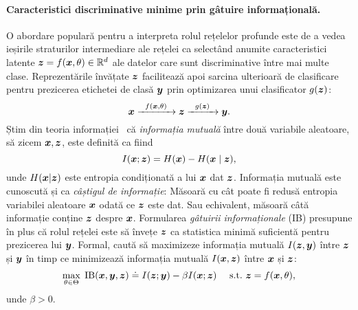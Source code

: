 \documentclass[../../book-main_ro.tex]{subfiles}
\begin{document}
\paragraph{Caracteristici discriminative minime prin gâtuire informațională.}
O abordare populară pentru a interpreta rolul rețelelor profunde este de a vedea ieșirile straturilor intermediare ale rețelei ca selectând anumite caracteristici latente $\bm{z} = f(\bm{x}, \theta) \in \mathbb{R}^d$ ale datelor care sunt discriminative între mai multe clase. Reprezentările învățate $\bm{z}$ facilitează apoi sarcina ulterioară de clasificare pentru prezicerea etichetei de clasă $\bm{y}$ prin optimizarea unui clasificator $g(\bm{z})$:
\begin{equation}
	\bm{x}   \xrightarrow{\hspace{2mm} f(\bm{x}, \theta)\hspace{2mm}} \bm{z}  \xrightarrow{\hspace{2mm} g(\bm{z}) \hspace{2mm}} \bm{y}.
\end{equation}
Știm din teoria informației~\cite{Cover-Thomas} că {\em informația mutuală} între două variabile aleatoare, să zicem $\bm{x},\bm{z}$, este definită ca fiind
\begin{equation}
	I(\bm{x}; \bm{z}) = H(\bm{x}) - H(\bm{x}\mid \bm{z}),
\end{equation}
unde $H(\bm{x} \vert \bm{z})$ este entropia condiționată a lui $\bm{x}$ dat $\bm{z}$. Informația mutuală este cunoscută și ca {\em câștigul de informație}: Măsoară cu cât poate fi redusă entropia variabilei aleatoare $\bm{x}$ odată ce $\bm{z}$ este dat. Sau echivalent, măsoară câtă informație conține $\bm{z}$ despre $\bm{x}$. Formularea {\em gâtuirii informaționale} (IB) \cite{Tishby-ITW2015} presupune în plus că rolul rețelei este să învețe $\bm{z}$ ca statistica minimă suficientă pentru prezicerea lui $\bm{y}$. Formal, caută să maximizeze informația mutuală $I(\bm{z}, \bm{y})$ între $\bm{z}$ și $\bm{y}$ în timp ce minimizează informația mutuală $I(\bm{x}, \bm{z})$ între $\bm{x}$ și $\bm{z}$:
\begin{equation}
	\max_{\theta\in \Theta}\; \mbox{IB}(\bm{x}, \bm{y}, \bm{z}) \doteq I(\bm{z}; \bm{y}) - \beta I(\bm{x}; \bm{z}) \quad\ \mathrm{s.t.}\ \bm{z} = f(\bm{x}, \theta),
	\label{chap4-eqn:information-bottleneck}
\end{equation}
unde $\beta >0$.
\end{document}
